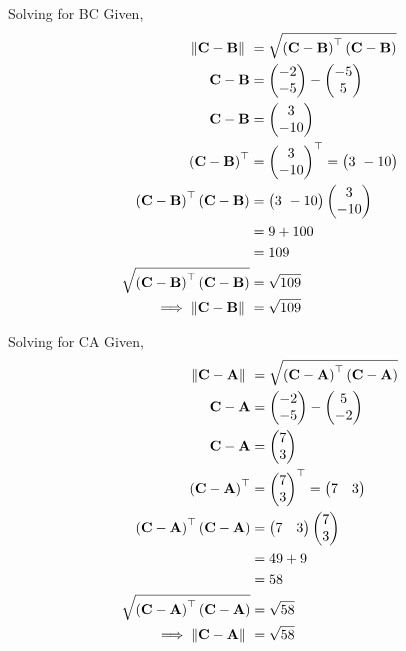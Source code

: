 \documentclass[11pt]{book}
\begin{document}
\begin{enumerate}[label=\thesection.\arabic*.,ref=\thesection.\theenumi]
Solving for BC 
Given, 
\begin{align}  
 \norm{\vec{C}-\vec{B}}\ &=  \sqrt{\brak{\vec{C}-\vec{B}}^{\top}\brak{\vec{C}-\vec{B}}} \\
 \vec{C}-\vec{B} &= \myvec{-2\\ -5} - \myvec{-5 \\ 5} \\
 \vec{C}-\vec{B} &= \myvec{3 \\ -10} \\
 \brak{\vec{C}-\vec{B}}^{\top} &= {\myvec{3 \\ -10}}^{\top} = \myvec{3 \ -10} \\
\brak{\vec{C}-\vec{B}}^{\top}\brak{\vec{C}-\vec{B}} &= \myvec{3  \ -10} \myvec{3 \\ -10}\\
             &= 9 + 100 \\
             &= 109 \\  
	\sqrt{\brak{\vec{C}-\vec{B}}^{\top}\brak{\vec{C}-\vec{B}}} &= \sqrt{109}	\\
	\implies \norm{\vec{C}-\vec{B}}\ &= \sqrt{109} 
\end{align}

Solving for CA
Given, 
\begin{align}  
	\norm{\vec{C}-\vec{A}}\ &=  \sqrt{\brak{\vec{C}-\vec{A}}^{\top}\brak{\vec{C}-\vec{A}}} \\
 \vec{C}-\vec{A} &= \myvec{-2 \\ -5} - \myvec{5 \\ -2} \\
 \vec{C}-\vec{A} &= \myvec{7 \\ 3} \\
 \brak{\vec{C}-\vec{A}}^{\top} &= {\myvec{7 \\ 3}}^{\top} = \myvec{7 & 3} \\
	\brak{\vec{C}-\vec{A}}^{\top}\brak{\vec{C}-\vec{A}} &= \myvec{7& 3} \myvec{7 \\ 3}\\
             &= 49 + 9 \\
             &= 58 \\  
	\sqrt{\brak{\vec{C}-\vec{A}}^{\top}\brak{\vec{C}-\vec{A}}} &= \sqrt{58}	\\
	\implies \norm{\vec{C}-\vec{A}}\ &= \sqrt{58} 
\end{align}




\end{enumerate}
\end{document}
